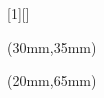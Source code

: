 \usepackage[absolute,overlay]{textpos}
\usepackage{graphicx}

[1][]
{
\begin{textblock*}{90mm}(30mm,35mm)\Large
  \inserttitle \\
      \vspace{2mm}
    \normalsize {\insertdate}
\end{textblock*}
\begin{textblock*}{90mm}(20mm,65mm)
  \small
  \insertauthor\\
  \vspace{2mm}
  \insertinstitute\\
\end{textblock*}

}

